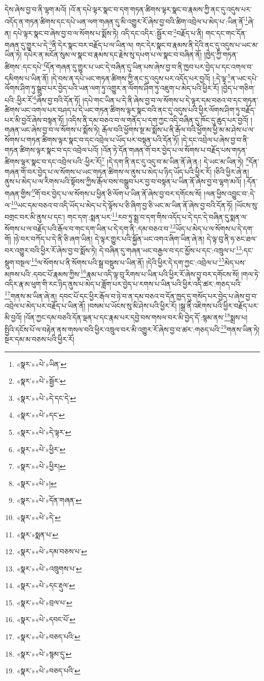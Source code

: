 དེས་ཞེས་བྱ་བ་ནི་ལྷག་མའོ། །འོ་ན་དཔེ་ལྟར་སྣང་བ་དག་གཏན་ཚིགས་ལྟར་སྣང་བ་རྣམས་ཀྱི་ནང་དུ་འདུས་པར་འདོད་ན་གཏན་ཚིགས་དང་དཔེ་ཡན་ལག་གཞན་དུ་མི་འགྱུར་རོ་ཞེས་བྱ་བའི་ཚིག་འབྲེལ་པ་མེད་པ་:ཡིན་ནོ་\footnote{«སྣར་»«པེ་»ཡིན་}ཞེ་ན། དཔེ་ལྟར་སྣང་བ་ཞེས་བྱ་བ་ལ་སོགས་པ་སྨོས་ཏེ། འདི་དང་འདིར་:སྦྱོར་བ་\footnote{«སྣར་»«པེ་»སྦྱོར་}བརྗོད་པ་ནི། གང་དང་གང་དོན་གཞན་དུ་གྱུར་པ་དེ་\footnote{«སྣར་»«པེ་»དེ་དང་དེ་}ནི་དེར་སྣང་བར་བརྗོད་པ་ལ་ཡིན་ལ། གང་དེར་སྣང་བ་རྣམས་ནི་དེའི་ནང་དུ་འདུས་པ་ཡང་མ་ཡིན་ཏེ། དཔེར་ན་མངོན་སུམ་ལ་སྣང་བ་རྣམས་དང་རྗེས་སུ་དཔག་པ་ལ་སྣང་བ་བཞིན་ནོ། །ཁྱེད་ཀྱི་གཏན་ཚིགས་:དང་དཔེ་\footnote{«སྣར་»«པེ་»དང་}དོན་གཞན་དུ་གྱུར་པ་ཡང་དེ་བཞིན་དུ་ཡིན་པས་ཞེས་བྱ་བ་ནི་ཁྱབ་པར་བྱེད་པ་དང་འགལ་བ་དམིགས་པ་ཡིན་ནོ། །དེ་བས་ན་དཔེ་ཡང་གཏན་ཚིགས་ཀྱི་ནང་དུ་འདུས་པར་འདོད་པར་བྱའོ། །:དེ་ལྟ་\footnote{«སྣར་»«པེ་»དེ་ལྟར་}ན་ཡང་དཔེ་ལོགས་ཤིག་ཏུ་སྒྲུབ་པར་བྱེད་པའི་ཡན་ལག་ཏུ་འགྱུར་ན་ལོགས་ཤིག་ཏུ་འཇུག་པ་མེད་པའི་ཕྱིར་རོ། །བྱེད་པ་གཅིག་པའི་:ཕྱིར་རོ་\footnote{«སྣར་»«པེ་»ཕྱིར་}ཞེས་བྱ་བའི་དོན་ཏོ། །དཔེ་གང་ཡིན་པ་དེ་ནི་ཞེས་བྱ་བ་ལ་སོགས་པ་དེ་ལྟར་དམ་བཅའ་བ་དང་གཏན་ཚིགས་ཡང་འགལ་པར་བཤད་པ་དེ་ཡང་གཏན་ཚིགས་ལྟར་སྣང་བའི་ནང་དུ་འདུས་པའི་ཕྱིར་ལོགས་ཤིག་ཏུ་བརྗོད་པར་མི་བྱའོ་ཞེས་བསྟན་ཏོ། །འདིས་ནི་དམ་བཅའ་བ་ལ་གནོད་པ་དག་ཀྱང་འདི་བཞིན་དུ་ཁོང་དུ་ཆུད་པར་བྱའོ། །གཞན་ཡང་ཞེས་བྱ་བ་ལ་སོགས་པ་སྨོས་ཏེ། རྒོལ་བའི་ཕྱོགས་སྔ་མ་སྨོས་པ་ནི་རྒོལ་བའི་ཕྱོགས་ཕྱི་མ་མ་ཤེས་པ་ལ་སོགས་པ་གཏན་ཚིགས་ལྟར་སྣང་བ་དང་འབྲེལ་པ་ཡོད་པར་བསྟན་པའི་དོན་ཏོ། །དེ་དང་འབྲེལ་པ་ཞེས་བྱ་བ་ནི་གཏན་ཚིགས་ལྟར་སྣང་བ་དང་འབྲེལ་པའོ། །འོན་ཏེ་དོན་གཞན་གོ་བར་བྱེད་པ་ལ་སོགས་པ་བརྗོད་པས་གཏན་ཚིགས་ལྟར་སྣང་བ་དང་འབྲེལ་པའི་:ཕྱིར་རོ།\footnote{«སྣར་»«པེ་»ཕྱིར།} །དེ་དག་ནི་ནང་དུ་འདུ་བ་མ་ཡིན་ནོ་ཞེ་ན:། དེ་ཡང་མ་ཡིན་ཏེ། \footnote{«སྣར་»«པེ་»།  }དོན་གཞན་གོ་བར་བྱེད་པ་ལ་སོགས་པ་ཡང་གཏན་ཚིགས་ལ་ནུས་པ་མེད་པ་ཉིད་ཡོད་པའི་ཕྱིར་རོ། །ཅིའི་ཕྱིར་ཞེ་ན། ནུས་པ་མེད་པ་ལ་རིགས་པའི་སྟོབས་ཀྱིས་རྒོལ་བས་བསྒྲུབ་པར་བྱ་བ་བསྟན་པ་ཡིན་ནོ་ཞེས་བྱ་བ་ལྷག་མའོ། །:དོན་གཞན་གྱིས་\footnote{«སྣར་»«པེ་»དོན་གཞན་}གོ་བར་བྱེད་པ་ལ་སོགས་པ་ཕྱིན་ཅི་ལོག་པ་ཡིན་ནོ་ཞེས་བྱ་བར་དགོངས་སོ། །ལན་ཕྱིས་འབྱུང་བ་:དེ་ལ་\footnote{«སྣར་»«པེ་»དེ་}ཡང་དམ་བཅའ་བ་འདི་ཡོད་པ་མེད་པ་དེ་ལྟོས་པ་ཅི་ཞིག་བྱ་ཅི་ཡང་མ་ཡིན་ནོ་ཞེས་བྱ་བའི་དོན་ཏོ། །ཡོངས་སུ་བགྲང་བར་མི་ནུས་པ་དང་། གང་དག་:སྨན་པར་\footnote{«སྣར་»སྨན་པ་}རབ་ཏུ་སྨྲ་བ་དག་གིས་འདོད་པ་དེ་དང་དེ་བཞིན་དུ་སྨན་ལ་སོགས་པ་ལ་བརྗོད་པའི་རྒོལ་བ་གང་དག་ཡིན་པ་དེ་དག་ནི་:དམ་བཅའ་བ་\footnote{«སྣར་»«པེ་»དམ་བཅས་པ་}ཡོད་པ་མེད་པ་ལ་སོགས་པ་དེ་དག་གོ། །ཉེ་བར་བཀོད་པ་དེ་ནི་ཅི་ཞག་ཡིན། དེ་ལྟར་གྱུར་པའི་སྐྱོན་ཡང་འགའ་ཞིག་ཡིན་ཞེ་ན། དེ་ལྟ་བུ་ནི་ཧ་ཅང་ཐལ་བར་འགྱུར་བའི་ཕྱིར་རོ་ཞེས་བྱ་བ་སྨོས་ཏེ། དེ་བཞིན་དུ་གཞན་ཡང་བརྒྱལ་བ་དང་མྱོས་པ་དང་:འཁྲུལ་པ་\footnote{«སྣར་»«པེ་»འཁྲུགས་པ་}:དང་སྡུག་བསྔལ་\footnote{«སྣར་»«པེ་»དང་རྡུལ་}ལ་སོགས་པ་ནི་སོགས་པའི་སྒྲ་བསྡུས་པ་ཡིན་ནོ། །དེའི་ཕྱིར་དེ་དག་ཀྱང་:འབྲེལ་པ་\footnote{«སྣར་»«པེ་»བྲལ་པ་}མེད་པས་མཁས་པའི་:དབང་པོ་རྣམས་ཀྱིས་\footnote{«སྣར་»«པེ་»དབང་པོ་}རྣམ་པ་འདི་ལྟ་བུ་རིགས་པ་ཡིན་པའི་ཕྱིར་རོ་ཞེས་བྱ་བར་དགོངས་སོ། །གལ་ཏེ་འདིར་རྣ་མ་ཕུག་གི་རང་ཉིད་ནུས་པ་མེད་པ་ཟློག་པར་བྱེད་པ་རགས་པ་ཡིན་པའི་ཕྱིར་འདི་ཚར་:གཅད་པའི་\footnote{«སྣར་»«པེ་»བཅད་པའི་}གནས་མ་ཡིན་ཞེ་ན། དབང་པོ་དང་ཕྱིར་རྒོལ་བ་ཉེ་བ་ན་དམ་བཅའ་བ་དོན་ཁྱད་དུ་གསོད་པར་བྱེད་པ་ཞེས་བྱ་བ་འབྲེལ་པ་མེད་པར་བརྗོད་པ་ཡིན་ནོ། །བསམ་པ་ཡོངས་སུ་མི་ཤེས་པའི་ཕྱིར་རོ། །སྒྲ་ནི་འཇིགས་པའི་ཕྱིར་བརྗོད་པར་མི་བྱའོ། །འོན་ཀྱང་དམ་བཅའི་དོན་ལྡན་པ་དང་རྣམ་པར་དབྱེ་བས་གསལ་བར་མི་བྱེད་དོ་:སྙམ་ནས་\footnote{«སྣར་»«པེ་»སྙམ་དུ་}སྨྲས་པ། སྤྱིའི་དངོས་པོ་ལ་བརྟེན་ནས་གསལ་བའི་ཕྱིར་འཁྲུལ་བར་མི་འགྱུར་རོ་ཞེས་བྱ་བ་ཚར་:གཅད་པའི་\footnote{«སྣར་»«པེ་»བཅད་པའི་}གནས་ཡིན་ཏེ། སྔར་དམ་མ་བཅས་པའི་ཕྱིར་རོ། 